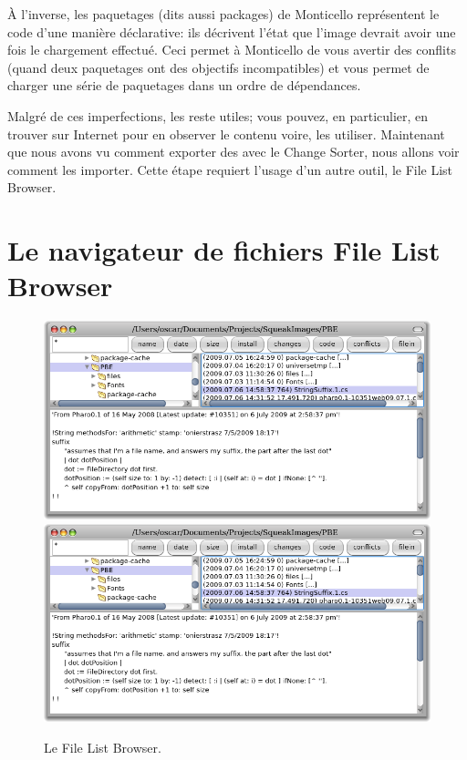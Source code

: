 \documentclass[a4paper,10pt,twoside]{book}
\begin{document}
\`A l'inverse, les paquetages (dits aussi packages) de Monticello repr\'esentent le code d'une mani\`ere 
d\'eclarative: ils d\'ecrivent l'\'etat que l'image devrait avoir une fois le chargement
effectu\'e.
Ceci permet \`a Monticello de vous avertir des conflits (quand deux paquetages ont des
objectifs incompatibles)
et vous permet de charger une s\'erie de paquetages dans un ordre de d\'ependances.

Malgr\'e de ces imperfections, les \changesets reste utiles; vous pouvez, en particulier, en trouver sur Internet pour en observer le contenu voire, les utiliser.
Maintenant que nous avons vu comment exporter des \changesets avec le Change Sorter,
nous allons voir comment les importer.
Cette \'etape requiert l'usage d'un autre outil, le File List Browser.

\section{Le navigateur de fichiers File List Browser}

\begin{figure}[btp]
	\begin{center}
	\ifluluelse
		{\includegraphics[width=\textwidth]{fileList}}
		{\includegraphics[scale=0.7]{fileList}}
	\end{center}
	\caption{Le File List Browser.}
	\label{fig:fileList}
\end{figure}
\end{document}
